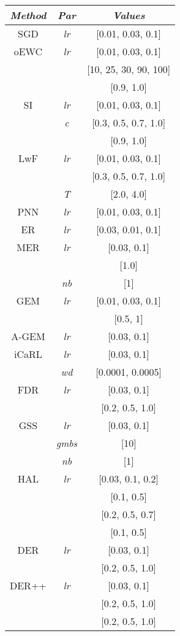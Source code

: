 \documentclass{article}
\begin{document}
{\begin{table}[H]
\begin{multicols}{3}
\begin{tabular}{ccc}
\textit{Method}  & \textit{Par} &
\textit{Values} \\
\midrule
SGD   & \textit{lr} & [0.01, 0.03, 0.1] \\
\midrule
oEWC  & \textit{lr} & [0.01, 0.03, 0.1] \\
& 	  \textit{} & [10, 25, 30, 90, 100] \\
& 	  \textit{} & [0.9, 1.0] \\
\midrule
SI  & \textit{lr} & [0.01, 0.03, 0.1] \\
& 	  \textit{c} & [0.3, 0.5, 0.7, 1.0] \\
& 	  \textit{} & [0.9, 1.0] \\
\midrule
LwF   & \textit{lr} & [0.01, 0.03, 0.1] \\
& 	  \textit{} & [0.3, 0.5, 0.7, 1.0] \\
& 	  \textit{T} & [2.0, 4.0] \\
\midrule
PNN   & \textit{lr} & [0.01, 0.03, 0.1] \\
\midrule
ER  & \textit{lr} & [0.03, 0.01, 0.1] \\
\midrule
MER  & \textit{lr} & [0.03, 0.1] \\
& 	  \textit{} & [1.0] \\
& 	  \textit{nb} & [1] \\
\midrule
GEM & \textit{lr} & [0.01, 0.03, 0.1] \\
&  \textit{} & [0.5, 1]\\
\midrule
A-GEM  & 	  \textit{lr} & [0.03, 0.1] \\
\midrule
iCaRL & \textit{lr} & [0.03, 0.1] \\
& 	  \textit{wd} & [0.0001, 0.0005] \\
\midrule
FDR   & \textit{lr} & [0.03, 0.1] \\
& 	  \textit{} & [0.2, 0.5, 1.0] \\
\midrule
GSS   & \textit{lr} & [0.03, 0.1] \\
& 	  \textit{gmbs} & [10] \\
& 	  \textit{nb} & [1] \\
\midrule
HAL   & \textit{lr} & [0.03, 0.1, 0.2] \\
& 	  \textit{} & [0.1, 0.5] \\
& 	  \textit{} & [0.2, 0.5, 0.7] \\
& 	  \textit{} & [0.1, 0.5] \\
\midrule
DER   & \textit{lr} & [0.03, 0.1] \\
& 	  \textit{} & [0.2, 0.5, 1.0] \\
\midrule
DER++ & \textit{lr} & [0.03, 0.1] \\
& 	  \textit{} & [0.2, 0.5, 1.0] \\
& 	  \textit{} & [0.2, 0.5, 1.0] \\
\bottomrule
\end{tabular}



\end{multicols}
\end{table}}
\end{document}

